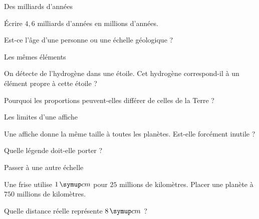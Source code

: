 \par\noindent\begin{minipage}{\linewidth}
\begin{exercice}[2]{Des milliards d’années}
\begin{questions}
\item Écrire $4{,}6$ milliards d’années en millions d’années.
\item Est-ce l’âge d’une personne ou une échelle géologique ?
\end{questions}
\end{exercice}
\end{minipage}
\par\noindent\begin{minipage}{\linewidth}
\begin{exercice}[2]{Les mêmes éléments}
\begin{questions}
\item On détecte de l’hydrogène dans une étoile. Cet hydrogène correspond-il à un élément propre à cette étoile ?
\item Pourquoi les proportions peuvent-elles différer de celles de la Terre ?
\end{questions}
\end{exercice}
\end{minipage}
\par\noindent\begin{minipage}{\linewidth}
\begin{exercice}[2]{Les limites d’une affiche}
\begin{questions}
\item Une affiche donne la même taille à toutes les planètes. Est-elle forcément inutile ?
\item Quelle légende doit-elle porter ?
\end{questions}
\end{exercice}
\end{minipage}
\par\noindent\begin{minipage}{\linewidth}
\begin{exercice}[2]{Passer à une autre échelle}
\begin{questions}
\item Une frise utilise $1\unite{cm}$ pour $25$ millions de kilomètres. Placer une planète à $750$ millions de kilomètres.
\item Quelle distance réelle représente $8\unite{cm}$ ?
\end{questions}
\end{exercice}
\end{minipage}
